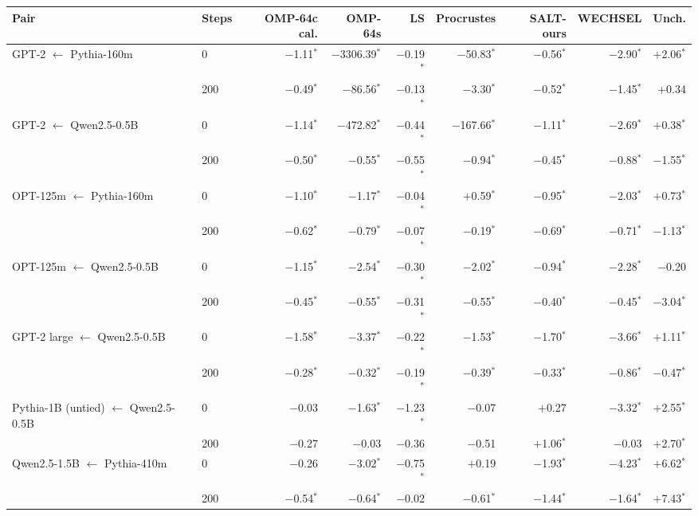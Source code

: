 \begin{tabular}{llrrrrrrr}
\toprule
Pair & Steps & OMP-64c cal. & OMP-64s & LS & Procrustes & SALT-ours & WECHSEL & Unch. \\
\midrule
GPT-2 $\leftarrow$ Pythia-160m & 0 & $-$1.11$^{*}$ & $-$3306.39$^{*}$ & $-$0.19$^{*}$ & $-$50.83$^{*}$ & $-$0.56$^{*}$ & $-$2.90$^{*}$ & $+$2.06$^{*}$ \\
 & 200 & $-$0.49$^{*}$ & $-$86.56$^{*}$ & $-$0.13$^{*}$ & $-$3.30$^{*}$ & $-$0.52$^{*}$ & $-$1.45$^{*}$ & $+$0.34 \\
\addlinespace
GPT-2 $\leftarrow$ Qwen2.5-0.5B & 0 & $-$1.14$^{*}$ & $-$472.82$^{*}$ & $-$0.44$^{*}$ & $-$167.66$^{*}$ & $-$1.11$^{*}$ & $-$2.69$^{*}$ & $+$0.38$^{*}$ \\
 & 200 & $-$0.50$^{*}$ & $-$0.55$^{*}$ & $-$0.55$^{*}$ & $-$0.94$^{*}$ & $-$0.45$^{*}$ & $-$0.88$^{*}$ & $-$1.55$^{*}$ \\
\addlinespace
OPT-125m $\leftarrow$ Pythia-160m & 0 & $-$1.10$^{*}$ & $-$1.17$^{*}$ & $-$0.04$^{*}$ & $+$0.59$^{*}$ & $-$0.95$^{*}$ & $-$2.03$^{*}$ & $+$0.73$^{*}$ \\
 & 200 & $-$0.62$^{*}$ & $-$0.79$^{*}$ & $-$0.07$^{*}$ & $-$0.19$^{*}$ & $-$0.69$^{*}$ & $-$0.71$^{*}$ & $-$1.13$^{*}$ \\
\addlinespace
OPT-125m $\leftarrow$ Qwen2.5-0.5B & 0 & $-$1.15$^{*}$ & $-$2.54$^{*}$ & $-$0.30$^{*}$ & $-$2.02$^{*}$ & $-$0.94$^{*}$ & $-$2.28$^{*}$ & $-$0.20 \\
 & 200 & $-$0.45$^{*}$ & $-$0.55$^{*}$ & $-$0.31$^{*}$ & $-$0.55$^{*}$ & $-$0.40$^{*}$ & $-$0.45$^{*}$ & $-$3.04$^{*}$ \\
\addlinespace
GPT-2 large $\leftarrow$ Qwen2.5-0.5B & 0 & $-$1.58$^{*}$ & $-$3.37$^{*}$ & $-$0.22$^{*}$ & $-$1.53$^{*}$ & $-$1.70$^{*}$ & $-$3.66$^{*}$ & $+$1.11$^{*}$ \\
 & 200 & $-$0.28$^{*}$ & $-$0.32$^{*}$ & $-$0.19$^{*}$ & $-$0.39$^{*}$ & $-$0.33$^{*}$ & $-$0.86$^{*}$ & $-$0.47$^{*}$ \\
\addlinespace
Pythia-1B (untied) $\leftarrow$ Qwen2.5-0.5B & 0 & $-$0.03 & $-$1.63$^{*}$ & $-$1.23$^{*}$ & $-$0.07 & $+$0.27 & $-$3.32$^{*}$ & $+$2.55$^{*}$ \\
 & 200 & $-$0.27 & $-$0.03 & $-$0.36 & $-$0.51 & $+$1.06$^{*}$ & $-$0.03 & $+$2.70$^{*}$ \\
\addlinespace
Qwen2.5-1.5B $\leftarrow$ Pythia-410m & 0 & $-$0.26 & $-$3.02$^{*}$ & $-$0.75$^{*}$ & $+$0.19 & $-$1.93$^{*}$ & $-$4.23$^{*}$ & $+$6.62$^{*}$ \\
 & 200 & $-$0.54$^{*}$ & $-$0.64$^{*}$ & $-$0.02 & $-$0.61$^{*}$ & $-$1.44$^{*}$ & $-$1.64$^{*}$ & $+$7.43$^{*}$ \\
\bottomrule
\end{tabular}
